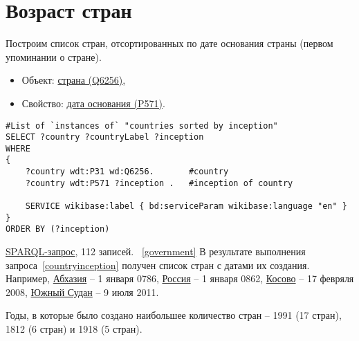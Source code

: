 \section{Возраст стран}

Построим список стран, отсортированных по дате основания страны (первом упоминании о стране).

\begin{itemize}
    \item Объект: \href{https://www.wikidata.org/wiki/Q6256}{страна (Q6256)},
    \item Свойство: \href{https://www.wikidata.org/wiki/Property:P571}{дата основания (P571)}.
\end{itemize}

\begin{lstlisting}[language=SPARQL label=countryinception, caption=Список стран упорядоченных по дате создания]
#List of `instances of` "countries sorted by inception" 
SELECT ?country ?countryLabel ?inception
WHERE
{
    ?country wdt:P31 wd:Q6256.       #country
    ?country wdt:P571 ?inception .   #inception of country
    
    SERVICE wikibase:label { bd:serviceParam wikibase:language "en" }
}
ORDER BY (?inception)
\end{lstlisting}


\href{https://query.wikidata.org/#%23List%20of%20%60instances%20of%60%20%22countries%20sorted%20by%20inception%22%20%0ASELECT%20%3Fcountry%20%3FcountryLabel%20%3Finception%0AWHERE%0A%7B%0A%20%20%20%20%3Fcountry%20wdt%3AP31%20wd%3AQ6256.%0A%20%20%20%20%3Fcountry%20wdt%3AP571%20%3Finception%20.%0A%20%20%20%20%0A%20%20%20%20SERVICE%20wikibase%3Alabel%20%7B%20bd%3AserviceParam%20wikibase%3Alanguage%20%22en%22%20%7D%0A%7D%0A%0AORDER%20BY%20%28%3Finception%29}{SPARQL-запрос}, 112 записей.
~\ref{government}
В результате выполнения запроса~\ref{countryinception} получен список стран с датами их создания. Например, \href{https://www.wikidata.org/wiki/Q23334}{Абхазия} -- 1 января 0786, \href{https://www.wikidata.org/wiki/Q159}{Россия} -- 1 января 0862, \href{https://www.wikidata.org/wiki/Q1246}{Косово} -- 17 февряля 2008, \href{https://www.wikidata.org/wiki/Q958}{Южный Судан} -- 9 июля 2011.

Годы, в которые было создано наибольшее количество стран -- 1991 (17 стран), 1812 (6 стран) и 1918 (5 стран). 